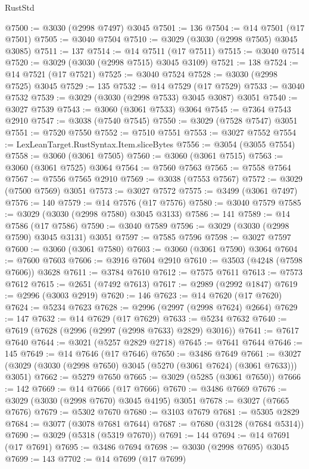 \begin{lexlean}{RustStd}
\begin{coremodule}
@7500 := @3030 (@2998 @7497) @3045
@7501 := 136
@7504 := @14 @7501 (@17 @7501)
@7505 := @3040 @7504
@7510 := @3029 (@3030 (@2998 @7505) @3045 @3085)
@7511 := 137
@7514 := @14 @7511 (@17 @7511)
@7515 := @3040 @7514
@7520 := @3029 (@3030 (@2998 @7515) @3045 @3109)
@7521 := 138
@7524 := @14 @7521 (@17 @7521)
@7525 := @3040 @7524
@7528 := @3030 (@2998 @7525) @3045
@7529 := 135
@7532 := @14 @7529 (@17 @7529)
@7533 := @3040 @7532
@7539 := @3029 (@3030 (@2998 @7533) @3045 @3087) @3051
@7540 := @3027 @7539
@7543 := @3060 (@3061 @7533) @3064
@7545 := @7364 @7543 @2910
@7547 := @3038 (@7540 @7545)
@7550 := @3029 (@7528 @7547) @3051
@7551 := @7520 @7550
@7552 := @7510 @7551
@7553 := @3027 @7552
@7554 := LexLeanTarget.RustSyntax.Item.sliceBytes
@7556 := @3054 (@3055 @7554)
@7558 := @3060 (@3061 @7505)
@7560 := @3060 (@3061 @7515)
@7563 := @3060 (@3061 @7525) @3064
@7564 := @7560 @7563
@7565 := @7558 @7564
@7567 := @7556 @7565 @2910
@7569 := @3038 (@7553 @7567)
@7572 := @3029 (@7500 @7569) @3051
@7573 := @3027 @7572
@7575 := @3499 (@3061 @7497)
@7576 := 140
@7579 := @14 @7576 (@17 @7576)
@7580 := @3040 @7579
@7585 := @3029 (@3030 (@2998 @7580) @3045 @3133)
@7586 := 141
@7589 := @14 @7586 (@17 @7586)
@7590 := @3040 @7589
@7596 := @3029 (@3030 (@2998 @7590) @3045 @3131) @3051
@7597 := @7585 @7596
@7598 := @3027 @7597
@7600 := @3060 (@3061 @7580)
@7603 := @3060 (@3061 @7590) @3064
@7604 := @7600 @7603
@7606 := @3916 @7604 @2910
@7610 := @3503 (@4248 (@7598 @7606)) @3628
@7611 := @3784 @7610
@7612 := @7575 @7611
@7613 := @7573 @7612
@7615 := @2651 (@7492 @7613)
@7617 := @2989 (@2992 @1847)
@7619 := @2996 (@3003 @2919)
@7620 := 146
@7623 := @14 @7620 (@17 @7620)
@7624 := @5234 @7623
@7628 := @2996 (@2997 (@2998 @7624) @2664)
@7629 := 147
@7632 := @14 @7629 (@17 @7629)
@7633 := @5234 @7632
@7640 := @7619 (@7628 (@2996 (@2997 (@2998 @7633) @2829) @3016))
@7641 := @7617 @7640
@7644 := @3021 (@5257 @2829 @2718)
@7645 := @7641 @7644
@7646 := 145
@7649 := @14 @7646 (@17 @7646)
@7650 := @3486 @7649
@7661 := @3027 (@3029 (@3030 (@2998 @7650) @3045 (@5270 (@3061 @7624) (@3061 @7633))) @3051)
@7662 := @5279 @7650
@7665 := @3029 (@5285 (@3061 @7650))
@7666 := 142
@7669 := @14 @7666 (@17 @7666)
@7670 := @3486 @7669
@7676 := @3029 (@3030 (@2998 @7670) @3045 @4195) @3051
@7678 := @3027 (@7665 @7676)
@7679 := @5302 @7670
@7680 := @3103 @7679
@7681 := @5305 @2829
@7684 := @3077 (@3078 @7681 @7644)
@7687 := @7680 (@3128 (@7684 @5314))
@7690 := @3029 (@5318 (@5319 @7670))
@7691 := 144
@7694 := @14 @7691 (@17 @7691)
@7695 := @3486 @7694
@7698 := @3030 (@2998 @7695) @3045
@7699 := 143
@7702 := @14 @7699 (@17 @7699)

\end{coremodule}
\end{lexlean}

